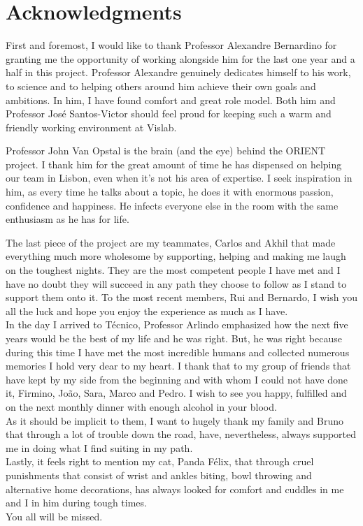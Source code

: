 
\chapter*{Acknowledgments}
First and foremost, I would like to thank Professor Alexandre Bernardino for granting me the opportunity of working alongside him for the last one year and a half in this project. Professor Alexandre genuinely dedicates himself to his work, to science and to helping others around him achieve their own goals and ambitions. In him, I have found comfort and great role model. Both him and Professor José Santos-Victor should feel proud for keeping such a warm and friendly working environment at Vislab.

Professor John Van Opstal is the brain (and the eye) behind the ORIENT project. I thank him for the great amount of time he has dispensed on helping our team in Lisbon, even when it's not his area of expertise. I seek inspiration in him, as every time he talks about a topic, he does it with enormous passion, confidence and happiness. He infects everyone else in the room with the same enthusiasm as he has for life.

The last piece of the project are my teammates, Carlos and Akhil that made everything much more wholesome by supporting, helping and making me laugh on the toughest nights. They are the most competent people I have met and I have no doubt they will succeed in any path they choose to follow as I stand to support them onto it. To the most recent members, Rui and Bernardo, I wish you all the luck and hope you enjoy the experience as much as I have.\\

In the day I arrived to Técnico, Professor Arlindo emphasized how the next five years would be the best of my life and he was right. But, he was right because during this time I have met the most incredible humans and collected  numerous memories I hold very dear to my heart. I thank that to my group of friends that have kept by my side from the beginning and with whom I could not have done it, Firmino, João, Sara, Marco and Pedro. I wish to see you happy, fulfilled and on the next monthly dinner with enough alcohol in your blood.\\

As it should be implicit to them, I want to hugely thank my family and Bruno that through a lot of trouble down the road, have, nevertheless, always supported me in doing what I find suiting in my path.\\ 

Lastly, it feels right to mention my cat, Panda Félix, that through cruel punishments that consist of wrist and ankles biting, bowl throwing and alternative home decorations, has always looked for comfort and cuddles in me and I in him during tough times.\\

You all will be missed.








